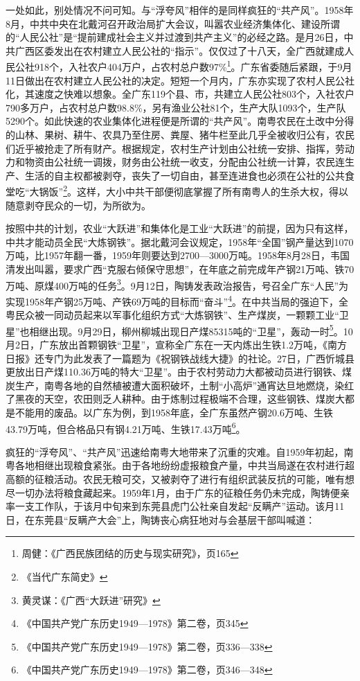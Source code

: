 一处如此，别处情况不问可知。与“浮夸风”相伴的是同样疯狂的“共产风”。1958年8月，中共中央在北戴河召开政治局扩大会议，叫嚣农业经济集体化、建设所谓的“人民公社”是“提前建成社会主义并过渡到共产主义”的必经之路。是月26日，中共广西区委发出在农村建立人民公社的“指示”。仅仅过了十八天，全广西就建成人民公社918个，入社农户404万户，占农村总户数97\%\footnote{周健：《广西民族团结的历史与现实研究》，页165}。广东省委随后紧跟，于9月11日做出在农村建立人民公社的决定。短短一个月内，广东亦实现了农村人民公社化，其速度之快难以想象。全广东119个县、市，共建立人民公社803个，入社农户790多万户，占农村总户数98.8\%，另有渔业公社81个，生产大队1093个，生产队5290个。如此快速的农业集体化进程便是所谓的“共产风”。南粤农民在土改中分得的山林、果树、耕牛、农具乃至住房、粪屋、猪牛栏至此几乎全被收归公有，农民们近乎被抢走了所有财产。根据规定，农村生产计划由公社统一安排、指挥，劳动力和物资由公社统一调拨，财务由公社统一收支，分配由公社统一计算，农民连生产、生活的自主权都被剥夺，丧失了一切自由，甚至连进食也必须在公社的公共食堂吃“大锅饭”\footnote{《当代广东简史》}。这样，大小中共干部便彻底掌握了所有南粤人的生杀大权，得以随意剥夺民众的一切，为所欲为。

按照中共的计划，农业“大跃进”和集体化是工业“大跃进”的前提，因为只有这样，中共才能动员全民“大炼钢铁”。据北戴河会议规定，1958年“全国”钢产量达到1070万吨，比1957年翻一番，1959年则要达到2700—3000万吨。1958年8月28日，韦国清发出叫嚣，要求广西“克服右倾保守思想”，在年底之前完成年产钢21万吨、铁70万吨、原煤400万吨的任务\footnote{黄灵谋：《广西“大跃进”研究》}。9月12日，陶铸发表政治报告，号召全广东“人民”为实现1958年产钢25万吨、产铁69万吨的目标而“奋斗”\footnote{《中国共产党广东历史1949—1978》第二卷，页345}。在中共当局的强迫下，全粤民众被一同动员起来以军事化组织方式“大炼钢铁”、生产煤炭，一颗颗工业“卫星”也相继出现。9月29日，柳州柳城出现日产煤85315吨的“卫星”，轰动一时\footnote{《中国共产党广东历史1949—1978》第二卷，页336—338}。10月2日，广东放出首颗钢铁“卫星”，宣称全广东在一天内炼出生铁1.2万吨，《南方日报》还专门为此发表了一篇题为《祝钢铁战线大捷》的社论。27日，广西忻城县更放出日产煤110.36万吨的特大“卫星”。由于农村劳动力大都被动员进行钢铁、煤炭生产，南粤各地的自然植被遭大面积破坏，土制“小高炉”通宵达旦地燃烧，染红了黑夜的天空，农田则乏人耕种。由于炼制过程极端不合理，这些钢铁、煤炭大都是不能用的废品。以广东为例，到1958年底，全广东虽然产钢20.6万吨、生铁43.79万吨，但合格品只有钢4.21万吨、生铁17.43万吨\footnote{《中国共产党广东历史1949—1978》第二卷，页346—348}。

疯狂的“浮夸风”、“共产风”迅速给南粤大地带来了沉重的灾难。自1959年初起，南粤各地相继出现粮食紧张。由于各地纷纷虚报粮食产量，中共当局遂在农村进行超高额的征粮活动。农民无粮可交，又被剥夺了进行有组织武装反抗的可能，唯有想尽一切办法将粮食藏起来。1959年1月，由于广东的征粮任务仍未完成，陶铸便亲率一支工作队，于该月中旬来到东莞县虎门公社亲自发起“反瞒产”运动。该月11日，在东莞县“反瞒产大会”上，陶铸丧心病狂地对与会基层干部叫喊道：

